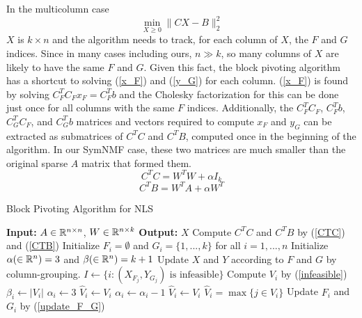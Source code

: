 In the multicolumn case 
\begin{equation} \label{multi_column_nls}
\min_{X \geq 0} \| C X - B \|_2^2
\end{equation}
$X$ is $k \times n$ and the algorithm needs to track, for each column of
$X$, the $F$ and $G$ indices. Since in many cases including ours,
$n \gg k$, so many columns of $X$ are likely to have the same $F$ and $G$.
Given this fact, the block pivoting algorithm has a shortcut to solving
(\ref{x_F}) and (\ref{y_G}) for each column. (\ref{x_F}) is found by solving
$C_F^T C_F x_F = C_F^T b$ and the Cholesky factorization for this can be done
just once for all columns with the same $F$ indices. Additionally, the
$C_F^T C_F$, $C_F^T b$, $C_G^T C_F$, and $C_G^T b$ matrices and vectors
required to compute $x_F$ and $y_G$ can be extracted as submatrices of $C^T C$
and $C^T B$, computed once in the beginning of the algorithm. In our SymNMF
case, these two matrices are much smaller than the original sparse $A$ matrix
that formed them.
\begin{equation} \label{CTC}
C^T C = W^T W + \alpha I_k
\end{equation}
\begin{equation} \label{CTB}
C^T B = W^T A + \alpha W^T
\end{equation}

\begin{algorithm}
\caption{Block Pivoting Algorithm for NLS}
\label{nls_alg}
\begin{algorithmic}
\State \textbf{Input:} $A \in \mathbb{R}^{n \times n}$, $W \in \mathbb{R}^{n \times k}$
\State \textbf{Output:} $X$
\State Compute $C^T C$ and $C^T B$ by (\ref{CTC}) and (\ref{CTB})
\State Initialize $F_i = \emptyset$ and $G_i = \{1, ..., k\}$
       for all $i = 1, ..., n$
\State Initialize $\alpha (\in \mathbb{R}^n) = 3$ and $\beta (\in \mathbb{R}^n) = k + 1$
\Repeat
  \State Update $X$ and $Y$ according to $F$ and $G$ by column-grouping.
  \State $I \gets \{i : (X_{F_j}, Y_{G_j}) \text{ is infeasible}\}$
    \State Compute $V_i$ by (\ref{infeasible})
      \State $\beta_i \gets |V_i|$
      \State $\alpha_i \gets 3$
      \State $\hat{V}_i \gets V_i$
      \State $\alpha_i \gets \alpha_i - 1$
      \State $\hat{V}_i \gets V_i$
      \State $\hat{V}_i = \max \{j \in V_i\}$
    \EndIf
    \State Update $F_i$ and $G_i$ by (\ref{update_F_G})
  \EndFor
{}
\end{algorithmic}
\end{algorithm}

